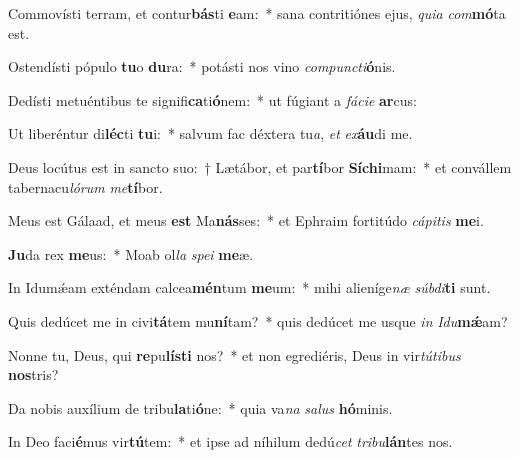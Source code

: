 \item Commovísti terram, et contur\textbf{bás}ti \textbf{e}am:~* sana contritiónes ejus, \textit{qui}\textit{a} \textit{com}\textbf{mó}ta est.
\item Ostendísti pópulo \textbf{tu}o \textbf{du}ra:~* potásti nos vino \textit{com}\textit{punc}\textit{ti}\textbf{ó}nis.
\item Dedísti metuéntibus te signifi\textbf{ca}ti\textbf{ó}nem:~* ut fúgiant a \textit{fá}\textit{ci}\textit{e} \textbf{ar}cus:
\item Ut liberéntur di\textbf{léc}ti \textbf{tu}i:~* salvum fac déxtera tu\textit{a}, \textit{et} \textit{ex}\textbf{áu}di me.
\item Deus locútus est in sancto suo:~† Lætábor, et par\textbf{tí}bor \textbf{Sí}\textbf{chi}mam:~* et convállem tabernacu\textit{ló}\textit{rum} \textit{me}\textbf{tí}bor.
\item Meus est Gálaad, et meus \textbf{est} Ma\textbf{nás}ses:~* et Ephraim fortitúdo \textit{cá}\textit{pi}\textit{tis} \textbf{me}i.
\item \textbf{Ju}da rex \textbf{me}us:~* Moab ol\textit{la} \textit{spe}\textit{i} \textbf{me}æ.
\item In Idumǽam exténdam calcea\textbf{mén}tum \textbf{me}um:~* mihi alieníge\textit{næ} \textit{súb}\textit{di}\textbf{ti} sunt.
\item Quis dedúcet me in civi\textbf{tá}tem mu\textbf{ní}tam?~* quis dedúcet me usque \textit{in} \textit{I}\textit{du}\textbf{mǽ}am?
\item Nonne tu, Deus, qui \textbf{re}pu\textbf{lís}\textbf{ti} nos?~* et non egrediéris, Deus in vir\textit{tú}\textit{ti}\textit{bus} \textbf{nos}tris?
\item Da nobis auxílium de tribu\textbf{la}ti\textbf{ó}ne:~* quia va\textit{na} \textit{sa}\textit{lus} \textbf{hó}minis.
\item In Deo faci\textbf{é}mus vir\textbf{tú}tem:~* et ipse ad níhilum dedú\textit{cet} \textit{tri}\textit{bu}\textbf{lán}tes nos.
